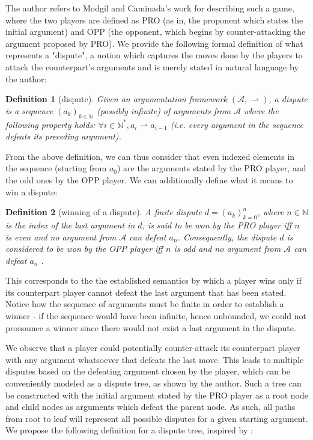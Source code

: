\documentclass[12pt, a4paper]{article}
\newcommand{\df}{\ensuremath{\rightharpoonup}}
\newtheorem{Def}{Definition}[subsection]
\begin{document}
The author refers to Modgil and Caminada's work \cite{modgil} for describing such a game, where the two players are defined as PRO (as in, the proponent which states the initial argument) and OPP (the opponent, which begins by counter-attacking the argument proposed by PRO). We provide the following formal definition of what represents a "dispute", a notion which captures the moves done by the players to attack the counterpart's arguments and is merely stated in natural language by the author:

\begin{Def}[dispute]
	Given an argumentation framework $(\mathcal{A}, \df)$, a dispute is a sequence $(a_{k})_{k \in \mathbb{N}}$ (possibly infinite) of arguments from $\mathcal{A}$ where the following property holds: $\forall i \in \mathbb{N^*},  a_{i} \df a_{i-1}$ (i.e. every argument in the sequence defeats its preceding argument).
\end{Def}

From the above definition, we can thus consider that even indexed elements in the sequence (starting from $a_0$) are the arguments stated by the PRO player, and the odd ones by the OPP player. We can additionally define what it means to win a dispute:

\begin{Def}[winning of a dispute]
	A finite dispute $d = (a_{k})_{k=0}^{n}$, where $n \in \mathbb{N}$ is the index of the last argument in $d$, is said to be won by the PRO player iff $n$ is even and no argument from $\mathcal{A}$ can defeat $a_n$. Consequently, the dispute $d$ is considered to be won by the OPP player iff $n$ is odd and no argument from $\mathcal{A}$ can defeat $a_n$ .
\end{Def}

This corresponds to the the established semantics by which a player wins only if its counterpart player cannot defeat the last argument that has been stated. Notice how the sequence of arguments must be finite in order to establish a winner - if the sequence would have been infinite, hence unbounded, we could not pronounce a winner since there would not exist a last argument in the dispute.

We observe that a player could potentially counter-attack its counterpart player with any argument whatsoever that defeats the last move. This leads to multiple disputes based on the defeating argument chosen by the player, which can be conveniently modeled as a dispute tree, as shown by the author. Such a tree can be constructed with the initial argument stated by the PRO player as a root node and child nodes as arguments which defeat the parent node. As such, all paths from root to leaf will represent all possible disputes for a given starting argument. We propose the following definition for a dispute tree, inspired by \cite{modgil}:
\end{document}
